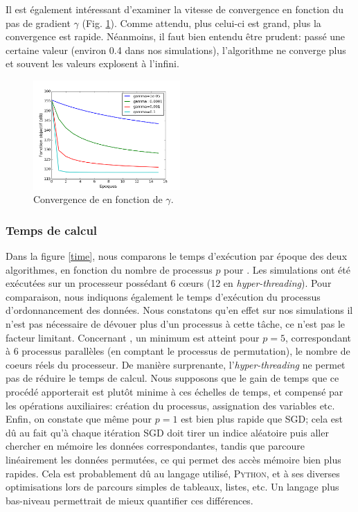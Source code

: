 \documentclass[10pt,a4paper]{article}
\begin{document}
Il est également intéressant d'examiner la vitesse de convergence en fonction du pas de gradient $\gamma$ (Fig. \ref{obj_gamma}). Comme attendu, plus celui-ci est grand, plus la convergence est rapide. Néanmoins, il faut bien entendu être prudent: passé une certaine valeur (environ 0.4 dans nos simulations), l'algorithme ne converge plus et souvent les valeurs explosent à l'infini.

\begin{figure}
\centering
\includegraphics[width=0.5\textwidth]{fig/obj_gamma}
\caption{Convergence de \jel en fonction de $\gamma$.}
\label{obj_gamma}
\end{figure}

\subsubsection*{Temps de calcul}
Dans la figure \ref{time}, nous comparons le temps d'exécution par époque des deux algorithmes, en fonction du nombre de processus $p$ pour \jel. Les simulations ont été exécutées sur un processeur possédant 6 cœurs (12 en \emph{hyper-threading}). Pour comparaison, nous indiquons également le temps d'exécution du processus d'ordonnancement des données. Nous constatons qu'en effet sur nos simulations il n'est pas nécessaire de dévouer plus d'un processus à cette tâche, ce n'est pas le facteur limitant. Concernant \jel, un minimum est atteint pour $p=5$, correspondant à $6$ processus parallèles (en comptant le processus de permutation), le nombre de coeurs réels du processeur. De manière surprenante, l'\emph{hyper-threading} ne permet pas de réduire le temps de calcul. Nous supposons que le gain de temps que ce procédé apporterait est plutôt minime à ces échelles de temps, et compensé par les opérations auxiliaires: création du processus, assignation des variables etc. Enfin, on constate que même pour $p=1$ \jel est bien plus rapide que SGD; cela est dû au fait qu'à chaque itération SGD doit tirer un indice aléatoire puis aller chercher en mémoire les données correspondantes, tandis que \jel parcoure linéairement les données permutées, ce qui permet des accès mémoire bien plus rapides. Cela est probablement dû au langage utilisé, \textsc{Python}, et à ses diverses optimisations lors de parcours simples de tableaux, listes, etc. Un langage plus bas-niveau permettrait de mieux quantifier ces différences.
\end{document}
